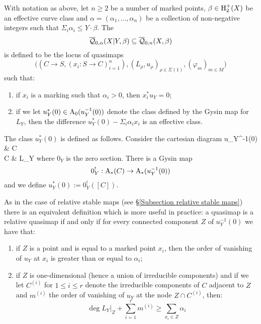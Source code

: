 \begin{definition} With notation as above, let $n \geq 2$ be a number of marked points, $\beta \in \operatorname{H}_2^+(X)$ be an effective curve class and $\alpha=(\alpha_1, \ldots, \alpha_n)$ be a collection of non-negative integers such that $\Sigma_i \alpha_i \leq Y \cdot \beta$. The 
\begin{equation*} \overline{\mathcal Q}_{0,\alpha}(X|Y,\beta) \subseteq \overline{\mathcal Q}_{0,n}(X,\beta) \end{equation*}
is defined to be the locus of quasimaps
\begin{equation*} \big((C \to S, (x_i : S \to C)_{i=1}^n), (L_\rho,u_\rho)_{\rho \in \Sigma(1)}, (\varphi_m)_{m \in M}\big) \end{equation*}
such that:
\begin{enumerate}
\item if $x_i$ is a marking such that $\alpha_i > 0$, then $x_i^* u_Y = 0$;
\item if we let $u_Y^*(0) \in \operatorname{A}_0(u_Y^{-1}(0))$ denote the class defined by the Gysin map for $L_Y$, then the difference $u_Y^*(0) - \Sigma_i \alpha_i x_i$ is an effective class.
\end{enumerate}
\end{definition}

\noindent The class $u_Y^*(0)$ is defined as follows. Consider the cartesian diagram
\bcd
u_Y^{-1}(0) \ar[r] \ar[d]  & C \ar[d,"u_Y"] \\
C \ar[r,"0_Y"] & L_Y
\ecd
where $0_Y$ is the zero section. There is a Gysin map
\begin{equation*} 0_Y^! : \operatorname{A}_*(C) \rightarrow \operatorname{A}_*(u_Y^{-1}(0)) \end{equation*}
and we define $u_Y^*(0) := 0_Y^!([C])$.


\begin{remark} As in the case of relative stable maps (see \S \ref{Subsection relative stable maps}) there is an equivalent definition which is more useful in practice: a quasimap is a relative quasimap if and only if for every connected component $Z$ of $u_Y^{-1}(0)$ we have that:
\begin{enumerate}
\item if $Z$ is a point and is equal to a marked point $x_i$, then the order of vanishing of $u_Y$ at $x_i$ is greater than or equal to $\alpha_i$;
\item if $Z$ is one-dimensional (hence a union of irreducible components) and if we let $C^{(i)}$ for $1 \leq i \leq r$ denote the irreducible components of $C$ adjacent to $Z$ and $m^{(i)}$ the order of vanishing of $u_Y$ at the node $Z \cap C^{(i)}$, then:
\begin{equation} \label{Relative quasimap internal component inequality} \deg L_Y|_Z + \sum_{i=1}^r m^{(i)} \geq \sum_{x_i \in Z} \alpha_i \end{equation}
\end{enumerate}
\end{remark}
